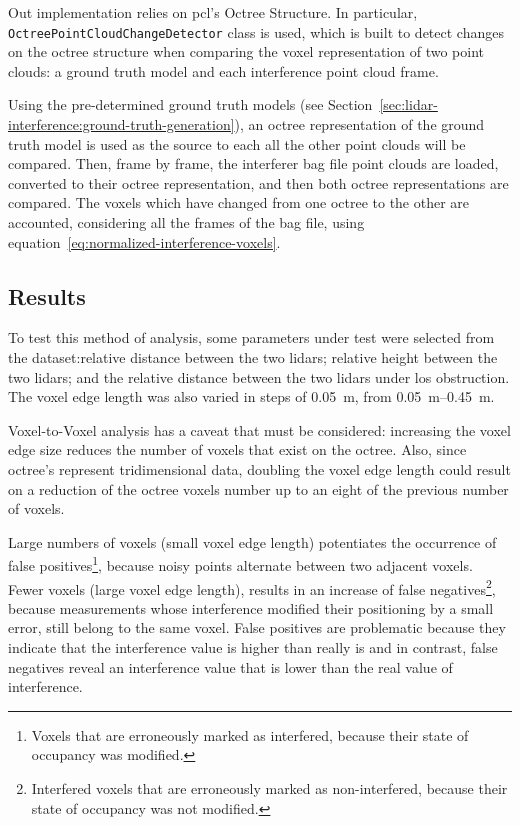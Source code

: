 Out implementation relies on \ac{pcl}'s Octree Structure. In particular, \texttt{OctreePointCloudChangeDetector} class is used, which is built to detect changes on the octree structure when comparing the voxel representation of two point clouds: a ground truth model and each interference point cloud frame. 

Using the pre-determined ground truth models (see Section~\ref{sec:lidar-interference:ground-truth-generation}), an octree representation of the ground truth model is used as the source to each all the other point clouds will be compared. Then, frame by frame, the interferer bag file point clouds are loaded, converted to their octree representation, and then both octree representations are compared. The voxels which have changed from one octree to the other are accounted, considering all the frames of the bag file, using equation~\ref{eq:normalized-interference-voxels}.


\subsection{Results}
\label{subsec:lidar-interference:voxel-to-voxel-analysis}

To test this method of analysis, some parameters under test were selected from the dataset:relative distance between the two \acp{lidar}; relative height between the two \acp{lidar}; and the relative distance between the two \acp{lidar} under \ac{los} obstruction. The voxel edge length was also varied in steps of \SI{0.05}{\meter}, from \SIrange{0.05}{0.45}{\meter}.

Voxel-to-Voxel analysis has a caveat that must be considered: increasing the voxel edge size reduces the number of voxels that exist on the octree. Also, since octree's represent tridimensional data, doubling the voxel edge length could result on a reduction of the octree voxels number up to an eight of the previous number of voxels. 

Large numbers of voxels (small voxel edge length) potentiates the occurrence of false positives\footnote{Voxels that are erroneously marked as interfered, because their state of occupancy was modified.}, because noisy points alternate between two adjacent voxels. Fewer voxels (large voxel edge length), results in an increase of false negatives\footnote{Interfered voxels that are erroneously marked as non-interfered, because their state of occupancy was not modified.}, because measurements whose interference modified their positioning by a small error, still belong to the same voxel. False positives are problematic because they indicate that the interference value is higher than really is and in contrast, false negatives reveal an interference value that is lower than the real value of interference.

